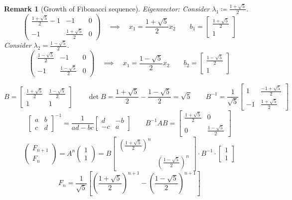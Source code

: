 \documentclass[a4paper]{article}
\numberwithin{lecref}{section}
\newtheorem*{Remark}{Remark}
\newcommand{\vectwo}[2]{\begin{pmatrix} #1 \\ #2 \end{pmatrix}}
\begin{document}
\begin{Remark}[Growth of Fibonacci sequence]
  \emph{Eigenvector:}
  Consider $\lambda_1 \coloneqq \frac{1 + \sqrt5}{2}$.
  \[
    \left(\begin{array}{cc|c}
      \frac{1 + \sqrt5}{2} - 1 & -1 & 0 \\
      -1 & \frac{1 + \sqrt5}{2} & 0
    \end{array}\right)
    \quad\implies\quad
    x_1 = \frac{1 + \sqrt5}{2} x_2 \qquad b_1 = \begin{bmatrix} \frac{1 + \sqrt5}{2} \\ 1 \end{bmatrix}
  \]
  Consider $\lambda_2 = \frac{1 - \sqrt5}{2}$.
  \[
    \left(\begin{array}{cc|c}
      \frac{1 - \sqrt5}{2} & -1 & 0 \\
      -1 & \frac{1 - \sqrt5}{2} & 0
    \end{array}\right)
    \quad\implies\quad
    x_1 = \frac{1 - \sqrt5}{2} x_2 \qquad
    b_2 = \begin{bmatrix} \frac{1 - \sqrt5}{2} \\ 1 \end{bmatrix} \]

  \[
    B = \begin{bmatrix} \frac{1 + \sqrt5}{2} & \frac{1 - \sqrt5}{2} \\ 1 & 1 \end{bmatrix} \qquad
    \det{B} = \frac{1 + \sqrt5}{2} - \frac{1 - \sqrt5}{2} = \sqrt5 \qquad
    B^{-1} = \frac{1}{\sqrt5} \begin{bmatrix} 1 & \frac{-1 + \sqrt5}{2} \\ -1 & \frac{1 + \sqrt5}{2} \end{bmatrix}
  \]
  \[
    \begin{bmatrix} a & b \\ c & d \end{bmatrix}^{-1} = \frac{1}{ad - bc} \begin{bmatrix} d & -b \\ -c & a \end{bmatrix} \qquad
    B^{-1} AB = \begin{bmatrix} \frac{1 + \sqrt5}{2} & 0 \\ 0 & \frac{1 - \sqrt5}{2} \end{bmatrix}
  \]
  \[ \vectwo{F_{n+1}}{F_n} = A^n \vectwo11 = B \begin{bmatrix} (\frac{1 + \sqrt5}{2})^n & \\ & (\frac{1 - \sqrt5}{2})^n \end{bmatrix} \cdot B^{-1} \cdot \begin{bmatrix} 1 \\ 1\end{bmatrix} \]
  \[ F_n = \frac1{\sqrt5} \left[\left(\frac{1 + \sqrt5}{2}\right)^{n+1} - \left(\frac{1 - \sqrt5}{2}\right)^{n+1}\right] \]


\end{Remark}
\end{document}
